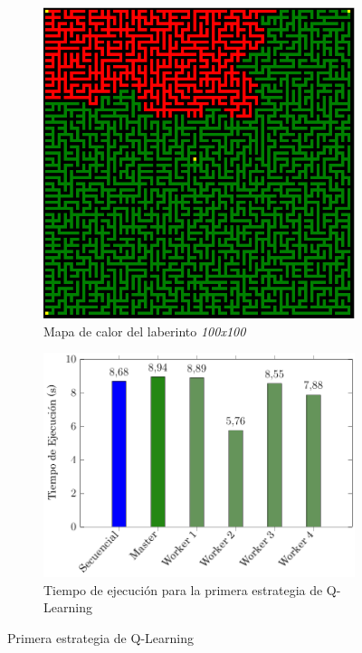 		\begin{figure}[!h]
			\centering
			\begin{subfigure}[t]{0.4\textwidth}
				\centering
				\includegraphics[width=\textwidth]{images/chapter_4/mapa_calor}
				\caption{Mapa de calor del laberinto \textit{100x100}}
				\label{fig:RL_mapa_calor}
			\end{subfigure}
			\hfill
			\begin{subfigure}[t]{0.5\textwidth}
				\centering
				\includegraphics[width=\textwidth]{images/chapter_4/histo}
				\caption{Tiempo de ejecución para la primera estrategia de Q-Learning}
				\label{fig:RL_histo}
			\end{subfigure}
			\caption{Primera estrategia de Q-Learning}
			\label{fig:RL_estrategia1}
		\end{figure}
		
